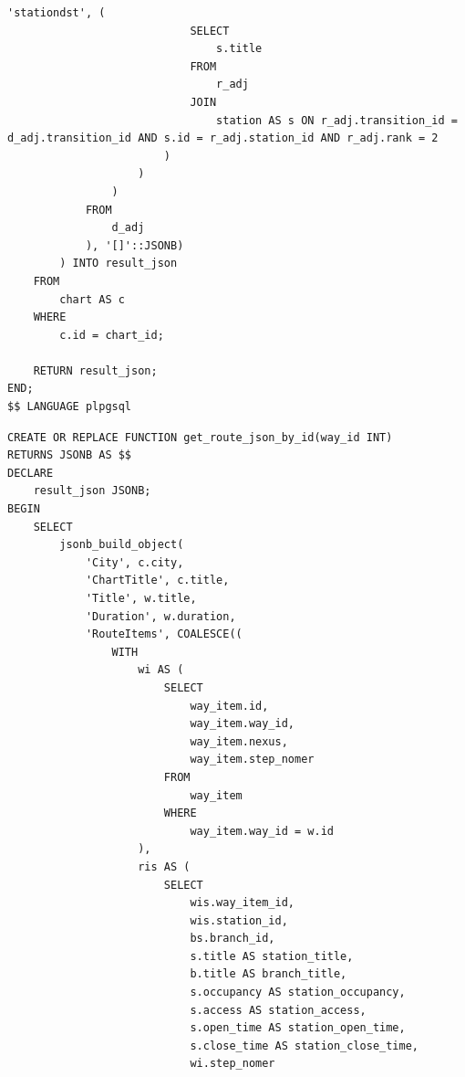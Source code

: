 \begin{lstlisting}[label=lst:get_chart_json_by_id:4,caption=Реализация функции получения схемы (часть 4),firstnumber=152]
                        'stationdst', (
                            SELECT
                                s.title 
                            FROM
                                r_adj
                            JOIN
                                station AS s ON r_adj.transition_id = d_adj.transition_id AND s.id = r_adj.station_id AND r_adj.rank = 2
                        )
                    )
                )
            FROM
                d_adj
            ), '[]'::JSONB)
        ) INTO result_json
    FROM
        chart AS c
    WHERE
        c.id = chart_id;

    RETURN result_json;
END;
$$ LANGUAGE plpgsql
\end{lstlisting}

\begin{lstlisting}[label=lst:get_route_json_by_id:1,caption=Реализация функции получения маршрута (часть 1),firstnumber=1]
CREATE OR REPLACE FUNCTION get_route_json_by_id(way_id INT)
RETURNS JSONB AS $$
DECLARE
    result_json JSONB;
BEGIN
    SELECT
        jsonb_build_object(
            'City', c.city,
            'ChartTitle', c.title,
            'Title', w.title,
            'Duration', w.duration,
            'RouteItems', COALESCE((
                WITH
                    wi AS (
                        SELECT
                            way_item.id,
                            way_item.way_id,
                            way_item.nexus,
                            way_item.step_nomer
                        FROM
                            way_item
                        WHERE
                            way_item.way_id = w.id
                    ),
                    ris AS (
                        SELECT
                            wis.way_item_id,
                            wis.station_id,
                            bs.branch_id,
                            s.title AS station_title,
                            b.title AS branch_title,
                            s.occupancy AS station_occupancy,
                            s.access AS station_access,
                            s.open_time AS station_open_time,
                            s.close_time AS station_close_time,
                            wi.step_nomer
\end{lstlisting}

\clearpage

